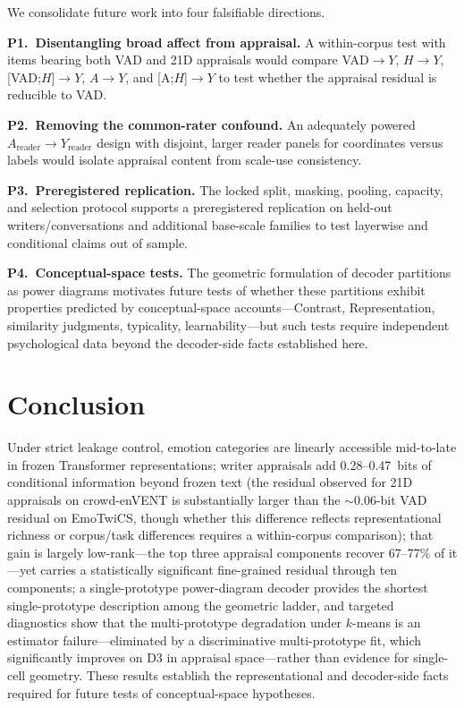\documentclass[11pt]{article}
\begin{document}
We consolidate future work into four falsifiable directions.

\textbf{P1.\ Disentangling broad affect from appraisal.} A within-corpus test with items bearing both VAD and 21D appraisals would compare VAD$\to Y$, $H\to Y$, [VAD;$H$]$\to Y$, $A\to Y$, and [A;$H$]$\to Y$ to test whether the appraisal residual is reducible to VAD.

\textbf{P2.\ Removing the common-rater confound.} An adequately powered $A_{\mathrm{reader}}\!\to\!Y_{\mathrm{reader}}$ design with disjoint, larger reader panels for coordinates versus labels would isolate appraisal content from scale-use consistency.

\textbf{P3.\ Preregistered replication.} The locked split, masking, pooling, capacity, and selection protocol supports a preregistered replication on held-out writers/conversations and additional base-scale families to test layerwise and conditional claims out of sample.

\textbf{P4.\ Conceptual-space tests.} The geometric formulation of decoder partitions as power diagrams motivates future tests of whether these partitions exhibit properties predicted by conceptual-space accounts---Contrast, Representation, similarity judgments, typicality, learnability---but such tests require independent psychological data beyond the decoder-side facts established here.

\section{Conclusion}

Under strict leakage control, emotion categories are linearly accessible mid-to-late in frozen Transformer representations; writer appraisals add 0.28--0.47~bits of conditional information beyond frozen text (the residual observed for 21D appraisals on crowd-enVENT is substantially larger than the $\sim$0.06-bit VAD residual on EmoTwiCS, though whether this difference reflects representational richness or corpus/task differences requires a within-corpus comparison); that gain is largely low-rank---the top three appraisal components recover 67--77\% of it---yet carries a statistically significant fine-grained residual through ten components; a single-prototype power-diagram decoder provides the shortest single-prototype description among the geometric ladder, and targeted diagnostics show that the multi-prototype degradation under $k$-means is an estimator failure---eliminated by a discriminative multi-prototype fit, which significantly improves on D3 in appraisal space---rather than evidence for single-cell geometry. These results establish the representational and decoder-side facts required for future tests of conceptual-space hypotheses.
\end{document}
